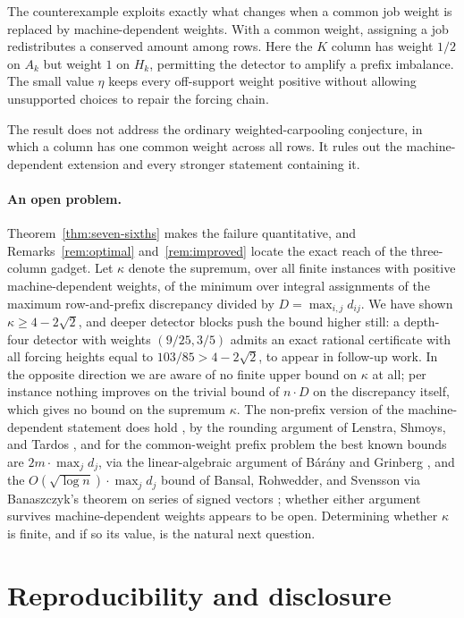 \documentclass[11pt]{article}
\theoremstyle{definition}
\begin{document}
The counterexample exploits exactly what changes when a common job weight is
replaced by machine-dependent weights.  With a common weight, assigning a job
redistributes a conserved amount among rows.  Here the $K$ column has weight
$1/2$ on $A_k$ but weight $1$ on $H_k$, permitting the detector to amplify a
prefix imbalance.  The small value $\eta$ keeps every off-support weight
positive without allowing unsupported choices to repair the forcing chain.

The result does not address the ordinary weighted-carpooling conjecture, in
which a column has one common weight across all rows.  It rules out the
machine-dependent extension and every stronger statement containing it.

\paragraph{An open problem.}
Theorem~\ref{thm:seven-sixths} makes the failure quantitative, and
Remarks~\ref{rem:optimal} and~\ref{rem:improved} locate the exact reach of
the three-column gadget.  Let $\kappa$ denote the supremum, over all finite
instances with positive machine-dependent weights, of the minimum over
integral assignments of the maximum row-and-prefix discrepancy divided by
$D=\max_{i,j}d_{ij}$.  We have shown $\kappa\ge4-2\sqrt2$, and deeper
detector blocks push the bound higher still: a depth-four detector with
weights $(9/25,3/5)$ admits an exact rational certificate with all forcing
heights equal to $103/85>4-2\sqrt2$, to appear in follow-up work.  In the
opposite direction we are aware of no finite upper bound on $\kappa$ at all;
per instance nothing improves on the trivial bound of $n\cdot D$ on the
discrepancy itself, which gives no bound on the supremum $\kappa$.  The
non-prefix version of the machine-dependent statement does hold
\citep{LiuReis2026}, by the rounding argument of Lenstra, Shmoys, and Tardos
\citep{LenstraShmoysTardos1990}, and for the common-weight prefix problem
the best known bounds are $2m\cdot\max_jd_j$, via the linear-algebraic
argument of B\'ar\'any and Grinberg \citep{BaranyGrinberg1981,Barany2008},
and the $O(\sqrt{\log n})\cdot\max_jd_j$ bound of Bansal, Rohwedder, and
Svensson \citep{BansalRohwedderSvensson2022} via Banaszczyk's theorem on
series of signed vectors \citep{Banaszczyk2012}; whether either argument
survives machine-dependent weights appears to be open.
Determining whether $\kappa$ is finite, and if so its value, is the natural
next question.

\section*{Reproducibility and disclosure}
\end{document}
